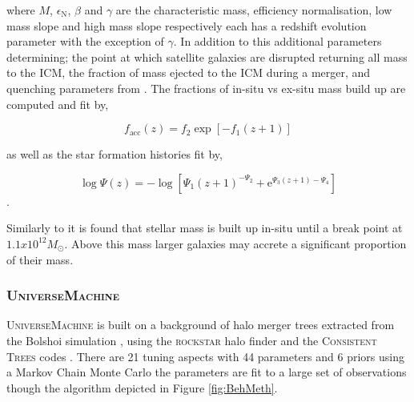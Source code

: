 where $M$, $\epsilon_{\mathrm{N}}$, $\beta$ and $\gamma$ are the characteristic mass, efficiency normalisation, low mass slope and high mass slope respectively each has a redshift evolution parameter with the exception of $\gamma$. In addition to this additional parameters determining; the point at which satellite galaxies are disrupted returning all mass to the ICM, the fraction of mass ejected to the ICM during a merger, and quenching parameters from \citet{Wetzel2013GalaxyUniverse}. The fractions of in-situ vs ex-situ mass build up are computed and fit by,

\begin{equation}
f_{\mathrm{acc}}(z) =f_{2} \exp \left[-f_{1}(z+1)\right] 
\end{equation}

as well as the star formation histories fit by,

\begin{equation}
\log \Psi(z) =-\log \left[\Psi_{1}(z+1)^{-\Psi_{2}}+\mathrm{e}^{\Psi_{3}(z+1)-\Psi_{4}}\right] 
\end{equation}.

Similarly to \citet{Rodriguez-Puebla2017ConstrainingProperties} it is found that stellar mass is built up in-situ until a break point at $1.1 x 10^{12} M_{\odot}$. Above this mass larger galaxies may accrete a significant proportion of their mass.

\subsubsection{U\textsc{niverse}M\textsc{achine}}
U\textsc{niverse}M\textsc{achine} \cite{Behroozi2019UniverseMachine:010} is built on a background of halo merger trees extracted from the Bolshoi simulation \citep{Klypin2016,Rodriguez-Puebla2016HaloSimulations}, using the \textsc{rockstar} halo finder and the C\textsc{onsistent} T\textsc{rees} codes \cite{Behroozi2013TheCores, Behroozi2013GRAVITATIONALLYCOSMOLOGY}. There are 21 tuning aspects with 44 parameters and 6 priors using a Markov Chain Monte Carlo the parameters are fit to a large set of observations though the algorithm depicted in Figure \ref{fig:BehMeth}.

